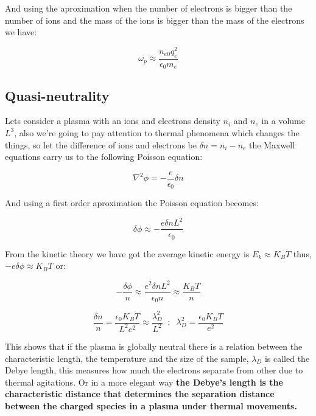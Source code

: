 \documentclass[spanish,notitlepage,letterpaper,11pt]{article} %
\numberwithin{equation}{subsection}
\begin{document}
    And using the aproximation when the number of electrons is bigger than the number of ions and the mass of the ions is bigger than the mass of the electrons we have:

    \begin{equation}
        \omega_p \approx \frac{n_{e0}q_e^2}{\epsilon_0m_e}
    \end{equation}

    \subsection{Quasi-neutrality}
    
        Lets consider a plasma with an ions and electrons density $n_i$ and $n_e$ in a volume $L^3$, also we're going to pay attention to thermal phenomena which changes the things, so let the difference of ions and electrons be $\delta n = n_i - n_e$ the Maxwell equations carry us to the following Poisson equation:

        \begin{equation}
            \nabla^2\phi = -\frac{e}{\epsilon_0}\delta n
        \end{equation}

        And using a first order aproximation the Poisson equation becomes:

        \begin{equation}
            \delta \phi \approx -\frac{e\delta n L^2}{\epsilon_0}
        \end{equation}

        From the kinetic theory we have got the average kinetic energy is $E_k \approx K_BT$ thus, $-e\delta\phi \approx K_BT$ or:

        \begin{equation*}
            -\frac{\delta \phi}{n} \approx \frac{e^2\delta n L^2}{\epsilon_0 n} \approx \frac{K_BT}{n}
        \end{equation*}

        \begin{equation}
            \frac{\delta n}{n} = \frac{\epsilon_0K_BT}{L^2e^2} \approx \frac{\lambda_D^2}{L^2} \;\;:\;\; \lambda_D^2 = \frac{\epsilon_0K_BT}{e^2}
        \end{equation}

        This shows that if the plasma is globally neutral there is a relation between the characteristic length, the temperature and the size of the sample, $\lambda_D$ is called the Debye length, this measures how much the electrons separate from other due to thermal agitations. Or in a more elegant way \textbf{the Debye's length is the characteristic distance that determines the separation distance between the charged species in a plasma under thermal movements.}\\
\end{document}
